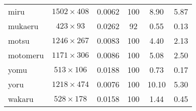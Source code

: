 \begin{table}[ht]
\begin{center}
\begin{tabular}{|p{}|c|c|c|c|c|}
miru & \( 1502 \times 408 \) & 0.0062      &  100  & 8.90   & 5.87       \\
mukaeru & \( 423 \times 93 \) & 0.0262     &  92   & 0.55   & 0.13    \\
motsu & \( 1246 \times 267 \) & 0.0083     &  100  & 4.40   & 2.13      \\
motomeru & \( 1171 \times 306 \) & 0.0086  &  100  & 5.08   & 2.50    \\
yomu & \( 513 \times 106 \) & 0.0188       &  100  & 0.73   & 0.17       \\
yoru & \( 1218 \times 474 \) & 0.0076      &  100  & 10.10  & 5.30       \\
wakaru & \( 528 \times 178 \) & 0.0158     &  100  &  1.44  & 0.45       \\ \hline
    \end{tabular}\label{jigen-com2}
  \end{center}
\end{table}


\begin{biography}
\newpage
{}



\end{biography}

